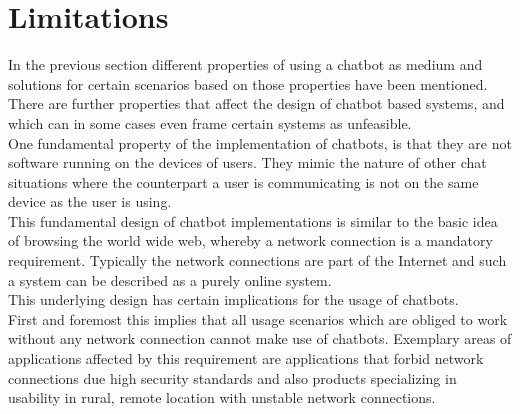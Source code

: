 \section{Limitations}

In the previous section different properties of using a chatbot as medium
and solutions for certain scenarios based on those properties have been mentioned.
\\

There are further properties that affect the design of chatbot based systems,
and which can in some cases even frame certain systems as unfeasible.
\\

One fundamental property of the implementation of chatbots,
is that they are not software running on the devices of users.
They mimic the nature of other chat situations where the counterpart
a user is communicating is not on the same device as the user is using.
\\
This fundamental design of chatbot implementations is similar to the basic
idea of browsing the world wide web, whereby a network connection is a mandatory requirement.
Typically the network connections are part of the Internet
and such a system can be described as a purely online system.
\\
This underlying design has certain implications for the usage of chatbots.
\\

First and foremost this implies that all usage scenarios which are obliged to work without any network connection
cannot make use of chatbots.
Exemplary areas of applications affected by this requirement are
applications that forbid network connections due high security standards
and also products specializing in usability in rural, remote location with unstable network connections.
\\

